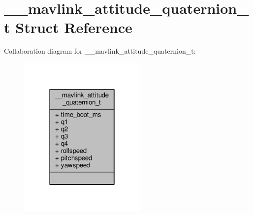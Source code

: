 \hypertarget{struct____mavlink__attitude__quaternion__t}{\section{\+\_\+\+\_\+mavlink\+\_\+attitude\+\_\+quaternion\+\_\+t Struct Reference}
\label{struct____mavlink__attitude__quaternion__t}
}


Collaboration diagram for \+\_\+\+\_\+mavlink\+\_\+attitude\+\_\+quaternion\+\_\+t\+:
\nopagebreak
\begin{figure}[H]
\begin{center}
\leavevmode
\includegraphics[width=178pt]{struct____mavlink__attitude__quaternion__t__coll__graph}
\end{center}
\end{figure}
